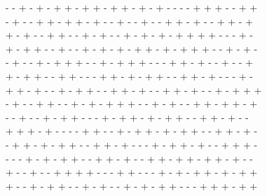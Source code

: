 \documentclass{article} \usepackage[utf8]{inputenc}
\begin{document}
{- - + - + - + + - + + - + + - + - + - - - - + + + - - + +\\
- + - - + + - + + - + - - + - - + - - + + - + - - + + - + \\
+ - + - - + + - - + - + - - + - + - + - + + + + - - - + -\\
+ - + + - - + - - + - + - + - + + - + - + + + - - + - + - \\
- + - - + - + + + - - + - + + + - - - + + - + - - + - - +\\
+ - + + - - + + - - - + + - + - + + - - + + - + - - - + - \\
+ + - + - - + - + + - - + + - + - - + + - + - - + - + + + \\
- + - - + + - - + - + - + + + - - + - + - - + + - + + - +\\
- - + - - + - + + - - - + - + + - + - + + - - + + - + - -\\
+ + + - + - - - - + + - - + - + + - + - + + - - + + - + - \\
- + + - + - + + - - + + - + - - - + - + + - + - - + + + - \\
- - - + - + - + + - - + + - + - - + + - + + - + + - + - - \\
+ - - + - - + + + + - - - + + - - - + - + - + + - + - + + \\
+ - - + - + + - - + - + - - + - + - + + - - - + + + - + + \\
}
\end{document}
